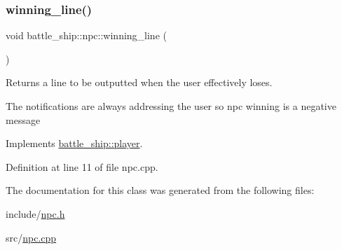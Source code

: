 \subsubsection{\texorpdfstring{winning\+\_\+line()}{winning\_line()}}
{\footnotesize\ttfamily void battle\+\_\+ship\+::npc\+::winning\+\_\+line (\begin{DoxyParamCaption}{ }\end{DoxyParamCaption})\hspace{0.3cm}{\ttfamily [virtual]}}



Returns a line to be outputted when the user effectively loses. 

The notifications are always addressing the user so npc winning is a negative message 

Implements \hyperlink{classbattle__ship_1_1player_a3110ec708fd8fc7e02a6e88a63d57d2f}{battle\+\_\+ship\+::player}.



Definition at line 11 of file npc.\+cpp.



The documentation for this class was generated from the following files\+:\begin{DoxyCompactItemize}
\item 
include/\hyperlink{npc_8h}{npc.\+h}\item 
src/\hyperlink{npc_8cpp}{npc.\+cpp}\end{DoxyCompactItemize}
